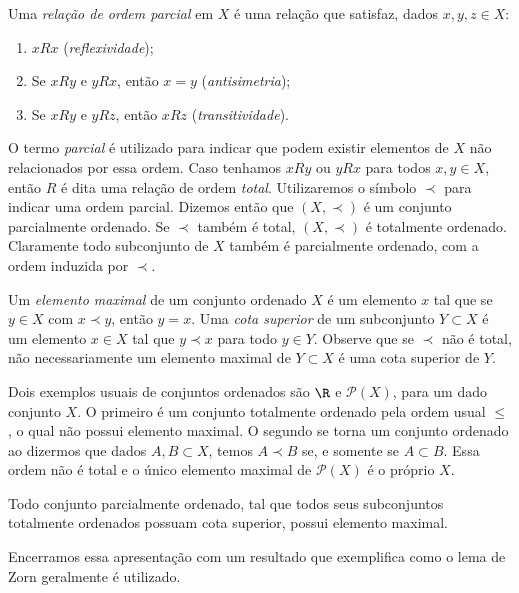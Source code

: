 Uma \emph{relação de ordem parcial} em \( X \) é uma relação que satisfaz, dados \( x, y, z \in X \):
\begin{enumerate}[label=\roman*)]
    \item \( x R x \) (\emph{reflexividade});
    \item Se \( x R y \) e \( y R x \), então \( x = y \) (\emph{antisimetria});
    \item Se \( x R y \) e \( y R z \), então \( x R z \) (\emph{transitividade}).
\end{enumerate}
O termo \emph{parcial} é utilizado para indicar que podem existir elementos de \( X \) não relacionados por essa ordem.
Caso tenhamos \( x R y \) ou \( y R x \) para todos \( x, y \in X \), então \( R \) é dita uma relação de ordem \emph{total}.
Utilizaremos o símbolo \( \prec \) para indicar uma ordem parcial.
Dizemos então que \( ( X, \prec ) \) é um conjunto parcialmente ordenado.
Se \( \prec \) também é total, \( ( X, \prec ) \) é totalmente ordenado.
Claramente todo subconjunto de \( X \) também é parcialmente ordenado, com a ordem induzida por \( \prec \).

Um \emph{elemento maximal} de um conjunto ordenado \( X \) é um elemento \( x \) tal que se \( y \in X \) com \( x \prec y \), então \( y = x \).
Uma \emph{cota superior} de um subconjunto \( Y \subset X \) é um elemento \( x \in X \) tal que \( y \prec x \) para todo \( y \in Y \).
Observe que se \( \prec \) não é total, não necessariamente um elemento maximal de \( Y \subset X \) é uma cota superior de \( Y \).

Dois exemplos usuais de conjuntos ordenados são \( \R \) e \( \mathcal{P} ( X ) \), para um dado conjunto \( X \).
O primeiro é um conjunto totalmente ordenado pela ordem usual \( \leq \), o qual não possui elemento maximal.
O segundo se torna um conjunto ordenado ao dizermos que dados \( A, B \subset X \), temos \( A \prec B \) se, e somente se \( A \subset  B \).
Essa ordem não é total e o único elemento maximal de \( \mathcal{P} ( X ) \) é o próprio \( X \).

\begin{axiom}
    Todo conjunto parcialmente ordenado, tal que todos seus subconjuntos totalmente ordenados possuam cota superior, possui elemento maximal.
\end{axiom}

Encerramos essa apresentação com um resultado que exemplifica como o lema de Zorn geralmente é utilizado.

